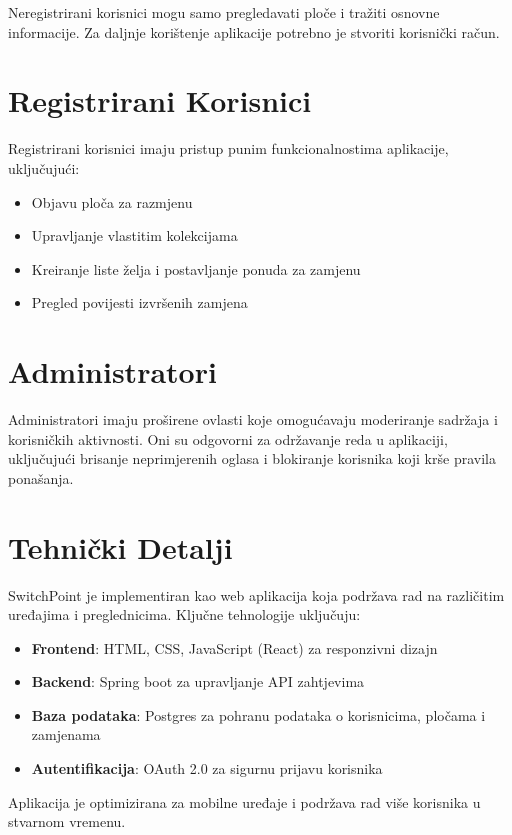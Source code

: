 Neregistrirani korisnici mogu samo pregledavati ploče i tražiti osnovne informacije. Za daljnje korištenje aplikacije potrebno je stvoriti korisnički račun.

\section{Registrirani Korisnici}

Registrirani korisnici imaju pristup punim funkcionalnostima aplikacije, uključujući:
\begin{itemize}
	\item Objavu ploča za razmjenu
	\item Upravljanje vlastitim kolekcijama
	\item Kreiranje liste želja i postavljanje ponuda za zamjenu
	\item Pregled povijesti izvršenih zamjena
\end{itemize}

\section{Administratori}

Administratori imaju proširene ovlasti koje omogućavaju moderiranje sadržaja i korisničkih aktivnosti. Oni su odgovorni za održavanje reda u aplikaciji, uključujući brisanje neprimjerenih oglasa i blokiranje korisnika koji krše pravila ponašanja.

\section{Tehnički Detalji}

SwitchPoint je implementiran kao web aplikacija koja podržava rad na različitim uređajima i preglednicima. Ključne tehnologije uključuju:

\begin{itemize}
	\item \textbf{Frontend}: HTML, CSS, JavaScript (React) za responzivni dizajn
	\item \textbf{Backend}: Spring boot za upravljanje API zahtjevima
	\item \textbf{Baza podataka}: Postgres za pohranu podataka o korisnicima, pločama i zamjenama
	\item \textbf{Autentifikacija}: OAuth 2.0 za sigurnu prijavu korisnika
\end{itemize}

Aplikacija je optimizirana za mobilne uređaje i podržava rad više korisnika u stvarnom vremenu.

